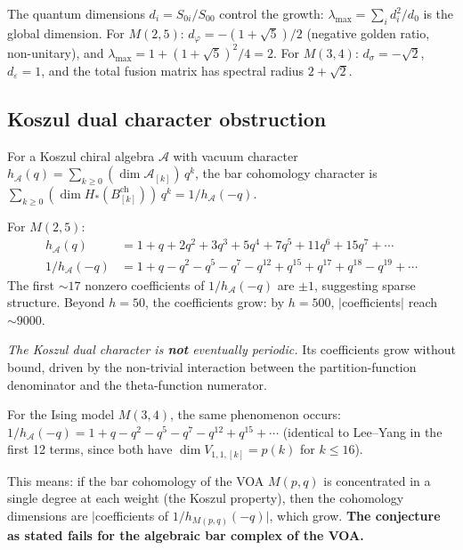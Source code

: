 \documentclass[11pt]{article}
\newcommand{\cA}{\mathcal{A}}
\begin{document}
\begin{remark}
The quantum dimensions
$d_i = S_{0i}/S_{00}$ control the growth:
$\lambda_{\max} = \sum_i d_i^2 / d_0$
is the global dimension.
For $M(2,5)$: $d_\varphi = -(1+\sqrt{5})/2$ (negative golden ratio,
non-unitary), and $\lambda_{\max} = 1 + (1+\sqrt{5})^2/4 = 2$.
For $M(3,4)$: $d_\sigma = -\sqrt{2}$, $d_\varepsilon = 1$,
and the total fusion matrix has spectral radius $2 + \sqrt{2}$.
\end{remark}

\subsection{Koszul dual character obstruction}
\label{subsec:mp-koszul-dual}

\begin{computation}
\label{comp:koszul-dual-obstruction}
For a Koszul chiral algebra $\cA$ with vacuum character
$h_\cA(q) = \sum_{k \ge 0} (\dim \cA_{[k]})\, q^k$,
the bar cohomology character is
$\sum_{k \ge 0} (\dim H_*(B^\mathrm{ch}_{[k]}))\, q^k
= 1/h_\cA(-q)$.

For $M(2,5)$:
\begin{align*}
h_\cA(q) &= 1 + q + 2q^2 + 3q^3 + 5q^4 + 7q^5 + 11q^6 + 15q^7 + \cdots \\
1/h_\cA(-q) &= 1 + q - q^2 - q^5 - q^7 - q^{12} + q^{15} + q^{17} + q^{18} - q^{19} + \cdots
\end{align*}
The first $\sim 17$ nonzero coefficients of $1/h_\cA(-q)$ are
$\pm 1$, suggesting sparse structure.  Beyond $h = 50$, the
coefficients grow: by $h = 500$, $|$coefficients$|$ reach $\sim 9000$.

\emph{The Koszul dual character is \textbf{not} eventually periodic.}
Its coefficients grow without bound, driven by the non-trivial
interaction between the partition-function denominator and the
theta-function numerator.

For the Ising model $M(3,4)$, the same phenomenon occurs:
$1/h_\cA(-q) = 1 + q - q^2 - q^5 - q^7 - q^{12} + q^{15} + \cdots$
(identical to Lee--Yang in the first 12 terms, since both have
$\dim V_{1,1,[k]} = p(k)$ for $k \le 16$).

This means: if the bar cohomology of the VOA $M(p,q)$ is
concentrated in a single degree at each weight (the Koszul
property), then the cohomology dimensions are
$|$coefficients of $1/h_{M(p,q)}(-q)|$, which grow.
\textbf{The conjecture as stated fails for the algebraic bar complex
of the VOA.}
\end{computation}
\end{document}
